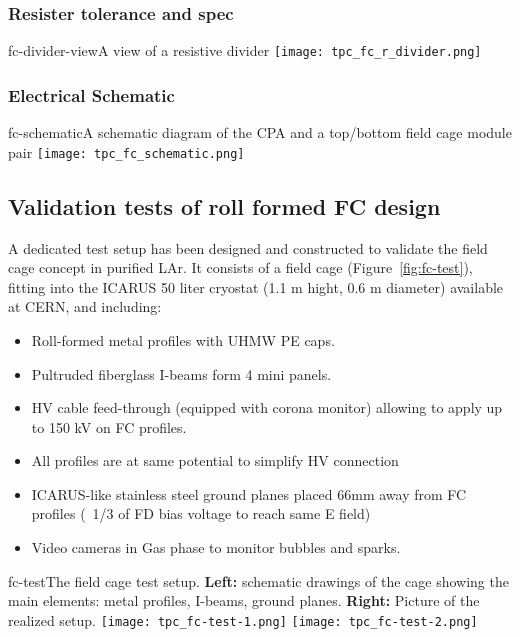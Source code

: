 \subsubsection{Resister tolerance and spec}

\begin{cdrfigure}{fc-divider-view}{A view of a resistive divider}
\texttt{[image: tpc\_fc\_r\_divider.png]}
\end{cdrfigure}

\subsubsection{Electrical Schematic}
 
\begin{cdrfigure}{fc-schematic}{A schematic diagram of the CPA and a top/bottom field cage module pair}
\texttt{[image: tpc\_fc\_schematic.png]}
\end{cdrfigure}

\subsection{Validation tests of roll formed FC design}

A dedicated test setup has been designed and constructed to validate the field cage concept  in purified LAr.
It consists of a field cage (Figure~\ref{fig:fc-test}), fitting into the ICARUS 50 liter cryostat (1.1 m hight, 0.6 m diameter) available at CERN, and  including:

\begin{itemize}	
\item Roll-formed metal profiles with UHMW PE caps.
\item Pultruded fiberglass I-beams form 4 mini panels.
\item HV cable feed-through (equipped with corona monitor) allowing to apply up to 150 kV on FC profiles.
\item All profiles are at same potential to simplify HV connection
\item ICARUS-like stainless steel ground planes placed  66mm away from FC profiles (~1/3 of FD bias voltage to reach
same E field)
\item Video cameras in Gas phase to monitor bubbles and sparks.
\end{itemize}

\begin{cdrfigure}{fc-test}{The field cage test setup. 
 {\bf Left:} schematic drawings of the cage showing the main elements: metal profiles, I-beams, ground planes.
  {\bf Right:} Picture of the realized setup.}
\texttt{[image: tpc\_fc-test-1.png]}
\texttt{[image: tpc\_fc-test-2.png]}
\end{cdrfigure}

